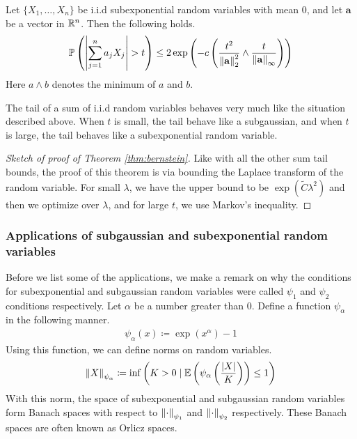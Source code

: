 \documentclass[11pt]{article}
\begin{document}
\begin{theorem}
  \label{thm:bernstein}
  Let $\{X_1, \ldots, X_n\}$ be i.i.d subexponential random variables with mean $0$, and let $\mathbf{a}$ be a vector in $\mathbb{R}^n$. Then the following holds.
  \begin{align*}
    \mathbb{P}\left( \left| \sum_{j=1}^n a_j X_j \right| > t \right) \leq
    2 \exp\left( -c \left( \frac{t^2}{\left\lVert\mathbf{a}\right\rVert_2^2} \wedge  \frac{t}{\left\lVert\mathbf{a}\right\rVert_\infty}\right) \right)
  \end{align*}
  Here $a \wedge b$ denotes the minimum of $a$ and $b$.
\end{theorem}
\begin{remark}
  The tail of a sum of i.i.d random variables behaves very much like the situation described above.
  When $t$ is small, the tail behave like a subgaussian, and when $t$ is large, the tail behaves like a subexponential random variable.
\end{remark}

\begin{proof}[Sketch of proof of Theorem \ref{thm:bernstein}]
  Like with all the other sum tail bounds, the proof of this theorem is via bounding the Laplace transform of the random variable.
  For small $\lambda$, we have the upper bound to be $\exp(\widetilde{C}\lambda^2)$ and then we optimize over $\lambda$, and for large $t$, we use Markov's inequality.
\end{proof}

\subsubsection{Applications of subgaussian and subexponential random variables}
\label{sec:appl-subg-subexp}

Before we list some of the applications, we make a remark on why the conditions for subexponential and subgaussian random variables were called $\psi_1$ and $\psi_2$ conditions respectively.
Let $\alpha$ be a number greater than $0$.
Define a function $\psi_{\alpha}$ in the following manner.
\begin{align*}
  \psi_{\alpha}(x) \coloneqq \exp(x^\alpha) - 1
\end{align*}
Using this function, we can define norms on random variables.
\begin{align*}
  \left\lVert X\right\rVert_{\psi_{\alpha}} \coloneqq \inf \left( K > 0 \mid \mathbb{E}\left( \psi_{\alpha} \left( \frac{|X|}{K} \right) \right) \leq 1 \right)
\end{align*}
With this norm, the space of subexponential and subgaussian random variables form Banach spaces with respect to $\left\lVert\cdot\right\rVert_{\psi_1}$ and $\left\lVert\cdot\right\rVert_{\psi_2}$ respectively. These Banach spaces are often known as Orlicz spaces.
\end{document}
